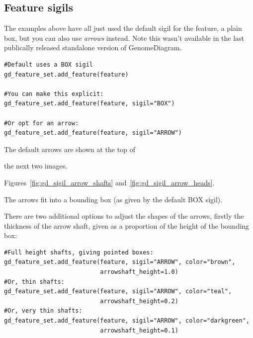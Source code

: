 \documentclass{report}
\begin{document}
\subsection{Feature sigils}
\label{sec:gd_arrow_sigils}

The examples above have all just used the default sigil for the feature, a
plain box, but you can also use \emph{arrows} instead.  Note this wasn't
available in the last publically released standalone version of
GenomeDiagram.

\begin{verbatim}
#Default uses a BOX sigil
gd_feature_set.add_feature(feature)

#You can make this explicit:
gd_feature_set.add_feature(feature, sigil="BOX")

#Or opt for an arrow:
gd_feature_set.add_feature(feature, sigil="ARROW")
\end{verbatim}

The default arrows are shown at the top of
\begin{htmlonly}
the next two images.
\end{htmlonly}
\begin{latexonly}
Figures~\ref{fig:gd_sigil_arrow_shafts} and~\ref{fig:gd_sigil_arrow_heads}.
\end{latexonly}
The arrows fit into a bounding box (as given by the default BOX sigil).

There are two additional options to adjust the shapes of the arrows, firstly
the thickness of the arrow shaft, given as a proportion of the height of the
bounding box:

\begin{verbatim}
#Full height shafts, giving pointed boxes:
gd_feature_set.add_feature(feature, sigil="ARROW", color="brown",
                           arrowshaft_height=1.0)
#Or, thin shafts:                      
gd_feature_set.add_feature(feature, sigil="ARROW", color="teal",
                           arrowshaft_height=0.2)
#Or, very thin shafts:
gd_feature_set.add_feature(feature, sigil="ARROW", color="darkgreen",
                           arrowshaft_height=0.1)
\end{verbatim}
\end{document}
